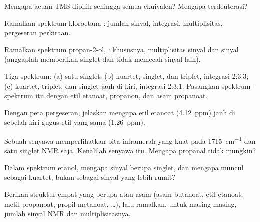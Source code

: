 \begin{exercise}[$\star$]\label{exo:g12:proton-nmr:5}
Mengapa acuan TMS dipilih sehingga semua  ekuivalen? Mengapa
 terdeuterasi?
\end{exercise}

\begin{exercise}[$\star\star$]\label{exo:g12:proton-nmr:6}
Ramalkan spektrum kloroetana : jumlah sinyal, integrasi,
multiplisitas, pergeseran perkiraan.
\end{exercise}

\begin{exercise}[$\star\star$]\label{exo:g12:proton-nmr:7}
Ramalkan spektrum propan-2-ol, : khususnya,
multiplisitas sinyal  dan sinyal  (anggaplah 
memberikan singlet dan tidak memecah sinyal lain).
\end{exercise}

\begin{exercise}[$\star\star$]\label{exo:g12:proton-nmr:8}
Tiga spektrum: (a) satu singlet; (b) kuartet, singlet, dan triplet,
integrasi 2:3:3; (c) kuartet, triplet, dan singlet jauh di kiri,
integrasi 2:3:1. Pasangkan spektrum-spektrum itu dengan etil etanoat,
propanon, dan asam propanoat.
\end{exercise}

\begin{exercise}[$\star\star$]\label{exo:g12:proton-nmr:9}
Dengan peta pergeseran, jelaskan mengapa  etil etanoat
(\qty{4.12}{ppm}) jauh di sebelah kiri  gugus etil yang sama
(\qty{1.26}{ppm}).
\end{exercise}

\begin{exercise}[$\star\star$]\label{exo:g12:proton-nmr:10}
Sebuah senyawa  memperlihatkan pita inframerah yang kuat pada
\qty{1715}{cm^{-1}} dan satu singlet NMR saja. Kenalilah senyawa itu.
Mengapa propanal tidak mungkin?
\end{exercise}

\begin{exercise}[$\star\star$]\label{exo:g12:proton-nmr:11}
Dalam spektrum etanol, mengapa sinyal  berupa singlet, dan
mengapa  muncul sebagai kuartet, bukan sebagai sinyal yang
lebih rumit?
\end{exercise}

\begin{exercise}[$\star\star\star$]\label{exo:g12:proton-nmr:12}
Berikan struktur empat   yang berupa  atau asam
(asam butanoat, etil etanoat, metil propanoat, propil metanoat,
\dots), lalu ramalkan, untuk masing-masing, jumlah sinyal NMR dan
multiplisitasnya.
\end{exercise}

